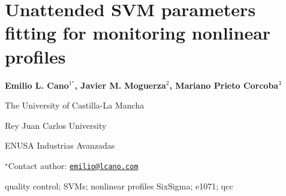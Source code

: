 \documentclass[\main/boa.tex]{subfiles}
\begin{document}
\section{Unattended SVM parameters fitting for monitoring nonlinear profiles}

\begin{center}
  {\bf {} Emilio L. Cano$^{1^\star}$,  Javier M. Moguerza$^{2}$,  Mariano Prieto Corcoba$^{3}$}
\end{center}

\vskip 0.3cm

\begin{affiliations}
\begin{enumerate}
\begin{minipage}{0.915\textwidth}
\centering
\item The University of Castilla-La Mancha \\[-2pt]
\item Rey Juan Carlos University \\[-2pt]
\item ENUSA Industrias Avanzadas \\[-2pt]
\end{minipage}
\end{enumerate}
$^\star$Contact author: \href{mailto:emilio@lcano.com}{\nolinkurl{emilio@lcano.com}}\\
\end{affiliations}

\vskip 0.5cm

\begin{minipage}{0.915\textwidth}
\keywords quality control; SVMs; nonlinear profiles
\packages {} SixSigma;  e1071;  qcc
\end{minipage}

\vskip 0.8cm
\end{document}
